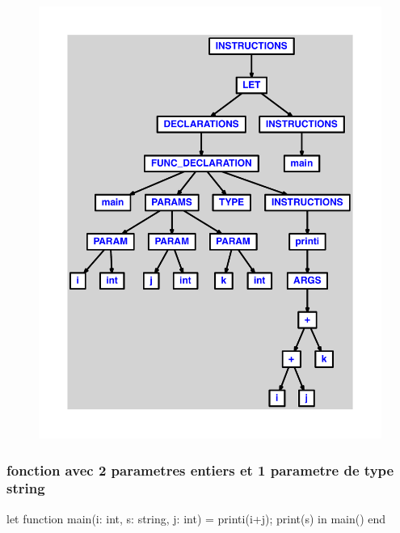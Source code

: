 \documentclass{article}
\begin{document}
\begin{figure}[H]\centering\includegraphics[max width=\textwidth]{ast/ast_226.pdf}\end{figure}\subsubsection{fonction avec 2 parametres entiers et 1 parametre de type string}
\begin{verbatimtab}
let
	function main(i: int, s: string, j: int) =
		printi(i+j);
		print(s)
in main() end
\end{verbatimtab}
\end{document}
